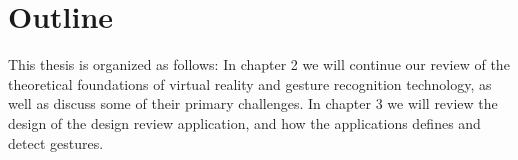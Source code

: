 \section{Outline}
This thesis is organized as follows: In chapter 2 we will continue our review of the theoretical foundations of virtual reality and gesture recognition technology, as well
as discuss some of their primary challenges. In chapter 3 we will review the design of the design review application, and how the applications defines and detect gestures. 
